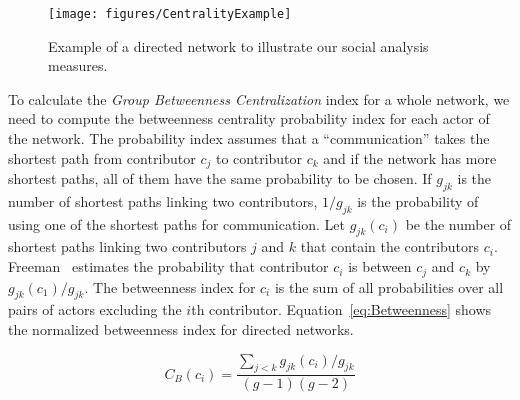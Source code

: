 \begin{figure}[t]
\begin{center}
\texttt{[image: figures/CentralityExample]}
\caption{Example of a directed network to illustrate our social
analysis measures.}
\label{fig:CentralityExample}
\end{center}
\end{figure}

To calculate the \emph{Group Betweenness Centralization} index for a whole
network, we need to compute the betweenness centrality probability index for each
actor of the network. The probability index assumes that a ``communication''
takes the shortest path from contributor $c_j$ to contributor $c_k$ and if the
network has more shortest paths, all of them have the same probability to be
chosen. If $g_{jk}$ is the number of shortest paths linking two contributors,
$1/g_{jk}$ is the probability of using one of the shortest paths for
communication. Let $g_{jk}(c_i)$ be the number of shortest paths linking two
contributors $j$ and $k$ that contain the contributors $c_i$. Freeman~\cite{Freeman:1979rl}
estimates the probability that contributor $c_i$ is between $c_j$ and $c_k$ by
$g_{jk}(c_1)/g_{jk}$. The betweenness index for $c_i$ is the sum of all
probabilities over all pairs of actors excluding the $i$th contributor.
Equation~\ref{eq:Betweenness} shows the normalized betweenness index for
directed networks.

\begin{equation}
\displaystyle C_B(c_i) =  \frac{\sum_{j<k} g_{jk}(c_i)/g_{jk}}{(g-1)(g-2)}
\label{eq:Betweenness}
\end{equation}

